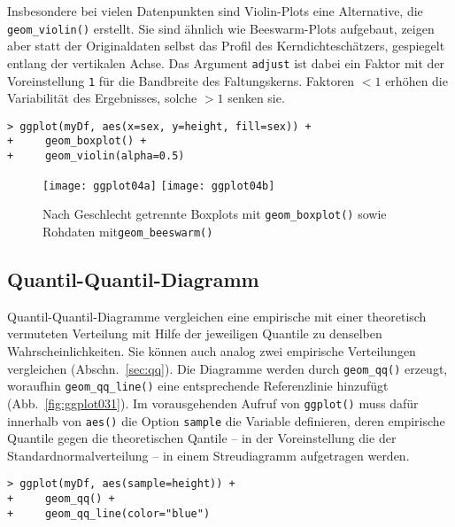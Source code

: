 Insbesondere bei vielen Datenpunkten sind Violin-Plots eine Alternative, die \lstinline!geom_violin()! erstellt. Sie sind ähnlich wie Beeswarm-Plots aufgebaut, zeigen aber statt der Originaldaten selbst das Profil des Kerndichteschätzers, gespiegelt entlang der vertikalen Achse. Das Argument \lstinline!adjust! ist dabei ein Faktor mit der Voreinstellung \lstinline!1! für die Bandbreite des Faltungskerns. Faktoren $< 1$ erhöhen die Variabilität des Ergebnisses, solche $> 1$ senken sie.
\begin{lstlisting}
> ggplot(myDf, aes(x=sex, y=height, fill=sex)) +
+     geom_boxplot() +
+     geom_violin(alpha=0.5)
\end{lstlisting}

\begin{figure}[ht]
\centering
\texttt{[image: ggplot04a]}
\texttt{[image: ggplot04b]}
\vspace*{-0.5em}
\caption{Nach Geschlecht getrennte Boxplots mit \lstinline!geom_boxplot()! sowie Rohdaten mit\lstinline!geom_beeswarm()!}
\label{fig:ggplot04}
\end{figure}
      
\subsection{Quantil-Quantil-Diagramm}
\label{sec:ggplotQQ}

Quantil-Quantil-Diagramme vergleichen eine empirische mit einer theoretisch vermuteten Verteilung mit Hilfe der jeweiligen Quantile zu denselben Wahrscheinlichkeiten. Sie können auch analog zwei empirische Verteilungen vergleichen (Abschn.\ \ref{sec:qq}). Die Diagramme werden durch \lstinline!geom_qq()! erzeugt, woraufhin \lstinline!geom_qq_line()! eine entsprechende Referenzlinie hinzufügt (Abb.\ \ref{fig:ggplot031}). Im vorausgehenden Aufruf von \lstinline!ggplot()! muss dafür innerhalb von \lstinline!aes()! die Option \lstinline!sample! die Variable definieren, deren empirische Quantile gegen die theoretischen Qantile -- in der Voreinstellung die der Standardnormalverteilung -- in einem Streudiagramm aufgetragen werden.
\begin{lstlisting}
> ggplot(myDf, aes(sample=height)) +
+     geom_qq() +
+     geom_qq_line(color="blue")
\end{lstlisting}

